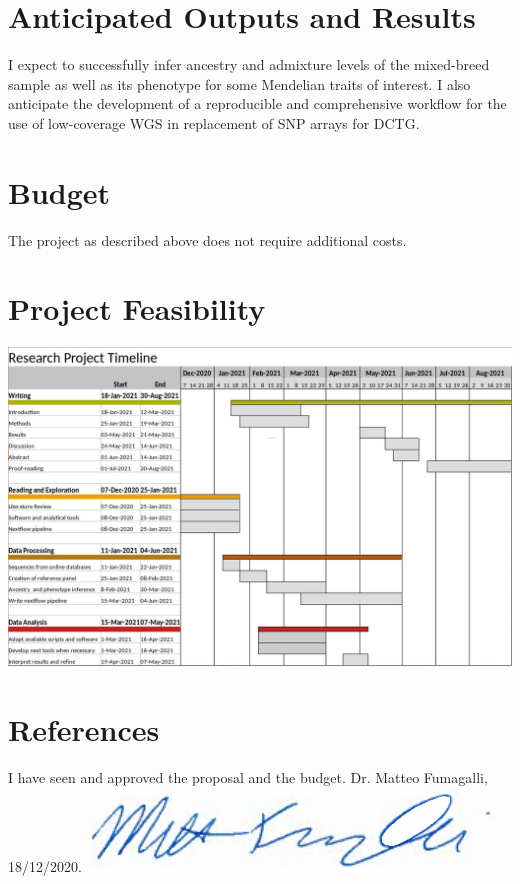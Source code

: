 \documentclass[a4paper,11]{article}
\begin{document}
\section{Anticipated Outputs and Results}
    I expect to successfully infer ancestry and admixture levels of the mixed-breed sample as well as its phenotype for some Mendelian traits of interest. I also anticipate the development of a reproducible and comprehensive workflow for the use of low-coverage WGS in replacement of SNP arrays for DCTG.
\section{Budget}
    The project as described above does not require additional costs.
\section{Project Feasibility}
\includegraphics[width=\textwidth]{ciao.jpg}

\pagebreak

\section{References}

\pagebreak

I have seen and approved the proposal and the budget.\newline\newline
Dr. Matteo Fumagalli, 18/12/2020.\newline
\includegraphics[scale=0.5]{signature.png}
\end{document}

